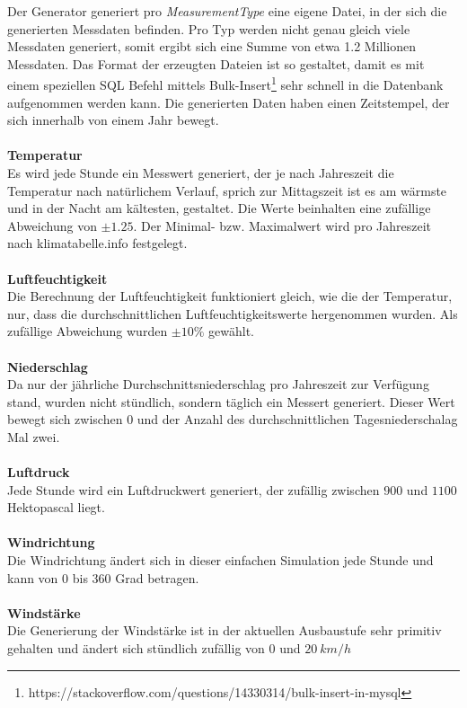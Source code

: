 Der Generator generiert pro \textit{MeasurementType} eine eigene Datei, in der sich die generierten Messdaten befinden. Pro Typ werden nicht genau gleich viele Messdaten generiert, somit ergibt sich eine Summe von etwa 1.2 Millionen Messdaten. Das Format der erzeugten Dateien ist so gestaltet, damit es mit einem speziellen SQL Befehl mittels Bulk-Insert\footnote{https://stackoverflow.com/questions/14330314/bulk-insert-in-mysql} sehr schnell in die Datenbank aufgenommen werden kann. Die generierten Daten haben einen Zeitstempel, der sich innerhalb von einem Jahr bewegt.~\\~\\ %

\textbf{Temperatur}\\
Es wird jede Stunde ein Messwert generiert, der je nach Jahreszeit die Temperatur nach natürlichem Verlauf, sprich zur Mittagszeit ist es am wärmste und in der Nacht am kältesten, gestaltet. Die Werte beinhalten eine zufällige Abweichung von $\pm 1.25$. Der Minimal- bzw. Maximalwert wird pro Jahreszeit nach klimatabelle.info festgelegt.~\\~\\ %

\textbf{Luftfeuchtigkeit}\\
Die Berechnung der Luftfeuchtigkeit funktioniert gleich, wie die der Temperatur, nur, dass die durchschnittlichen Luftfeuchtigkeitswerte hergenommen wurden. Als zufällige Abweichung wurden $\pm10\%$ gewählt.~\\~\\ %

\textbf{Niederschlag}\\
Da nur der jährliche Durchschnittsniederschlag pro Jahreszeit zur Verfügung stand, wurden nicht stündlich, sondern täglich ein Messert generiert. Dieser Wert bewegt sich zwischen $0$ und der Anzahl des durchschnittlichen Tagesniederschalag Mal zwei.~\\~\\ %

\textbf{Luftdruck}\\
Jede Stunde wird ein Luftdruckwert generiert, der zufällig zwischen $900$ und $1100$ Hektopascal liegt.~\\~\\ %

\textbf{Windrichtung}\\
Die Windrichtung ändert sich in dieser einfachen Simulation jede Stunde und kann von $0$ bis $360$ Grad betragen.~\\~\\ %

\textbf{Windstärke}\\
Die Generierung der Windstärke ist in der aktuellen Ausbaustufe sehr primitiv gehalten und ändert sich stündlich zufällig von $0$ und $20\ km/h$
